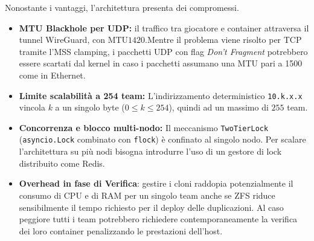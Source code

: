 Nonostante i vantaggi, l'architettura presenta dei compromessi.

\begin{itemize}
\tightlist
\item
  \textbf{MTU Blackhole per UDP:} il traffico tra giocatore e container
  attraversa il tunnel WireGuard, con \(\text{MTU} 1420\).Mentre il
  problema viene risolto per TCP tramite l'MSS clamping, i pacchetti UDP
  con flag \emph{Don't Fragment} potrebbero essere scartati dal kernel
  in caso i pacchetti assumano una MTU pari a 1500 come in Ethernet.
\item
  \textbf{Limite scalabilità a 254 team:} L'indirizzamento
  deterministico \passthrough{\lstinline!10.k.x.x!} vincola \(k\) a un
  singolo byte (\(0 \le k \le 254\)), quindi ad un massimo di
  \(\text{255}\) team.
\item
  \textbf{Concorrenza e blocco multi-nodo:} Il meccanismo
  \passthrough{\lstinline!TwoTierLock!}
  (\passthrough{\lstinline!asyncio.Lock!} combinato con
  \passthrough{\lstinline!flock!}) è confinato al singolo nodo. Per
  scalare l'architettura su più nodi bisogna introdurre l'uso di un
  gestore di lock distribuito come Redis.
\item
  \textbf{Overhead in fase di Verifica}: gestire i cloni raddopia
  potenzialmente il consumo di CPU e di RAM per un singolo team anche se
  ZFS riduce sensibilmente il tempo richiesto per il deploy delle
  duplicazioni. Al caso peggiore tutti i team potrebbero richiedere
  contemporaneamente la verifica dei loro container penalizzando le
  prestazioni dell'host.
\end{itemize}
